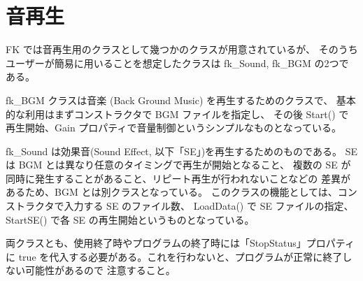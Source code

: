 \section{音再生}

FK では音再生用のクラスとして幾つかのクラスが用意されているが、
そのうちユーザーが簡易に用いることを想定したクラスは fk\_Sound, fk\_BGM の2つである。

fk\_BGM クラスは音楽 (Back Ground Music) を再生するためのクラスで、
基本的な利用はまずコンストラクタで BGM ファイルを指定し、
その後 Start() で再生開始、Gain プロパティで音量制御というシンプルなものとなっている。

fk\_Sound は効果音(Sound Effect, 以下「SE」)を再生するためのものである。
SE は BGM とは異なり任意のタイミングで再生が開始となること、
複数の SE が同時に発生することがあること、リピート再生が行われないことなどの
差異があるため、BGM とは別クラスとなっている。
このクラスの機能としては、コンストラクタで入力する SE のファイル数、
LoadData() で SE ファイルの指定、StartSE() で各 SE の再生開始というものとなっている。

両クラスとも、使用終了時やプログラムの終了時には「StopStatus」プロパティに
true を代入する必要がある。これを行わないと、プログラムが正常に終了しない可能性があるので
注意すること。
\\ ~

